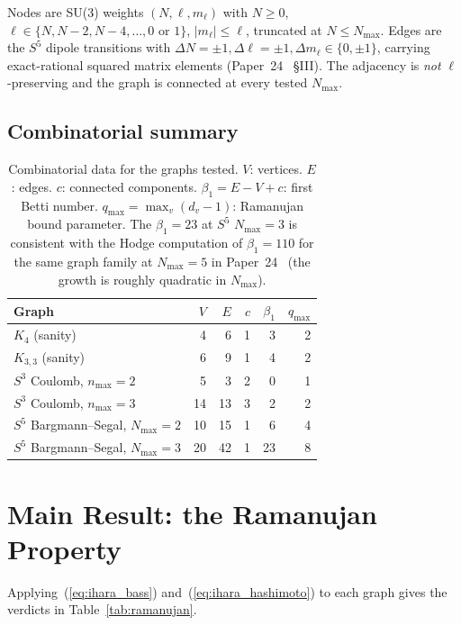 \documentclass[11pt]{article}
\begin{document}
Nodes are SU(3) weights $(N,\ell,m_\ell)$ with $N\ge 0$,
$\ell\in\{N, N{-}2, N{-}4, \ldots, 0\text{ or }1\}$,
$|m_\ell|\le\ell$, truncated at $N\le N_{\max}$.  Edges are the $S^5$
dipole transitions with $\Delta N=\pm 1, \Delta\ell=\pm 1,
\Delta m_\ell\in\{0,\pm 1\}$, carrying exact-rational squared
matrix elements (Paper~24~\cite{paper24} \S III).  The adjacency is
\emph{not} $\ell$-preserving and the graph is connected at every
tested $N_{\max}$.

\subsection{Combinatorial summary}

\begin{table}[h]
\centering
\begin{tabular}{lrrrrr}
\toprule
Graph & $V$ & $E$ & $c$ & $\beta_1$ & $q_{\max}$ \\
\midrule
$K_4$ (sanity) & 4 & 6 & 1 & 3 & 2 \\
$K_{3,3}$ (sanity) & 6 & 9 & 1 & 4 & 2 \\
$S^3$ Coulomb, $n_{\max}=2$ & 5 & 3 & 2 & 0 & 1 \\
$S^3$ Coulomb, $n_{\max}=3$ & 14 & 13 & 3 & 2 & 2 \\
$S^5$ Bargmann--Segal, $N_{\max}=2$ & 10 & 15 & 1 & 6 & 4 \\
$S^5$ Bargmann--Segal, $N_{\max}=3$ & 20 & 42 & 1 & 23 & 8 \\
\bottomrule
\end{tabular}
\caption{Combinatorial data for the graphs tested.  $V$: vertices.
$E$: edges.  $c$: connected components.  $\beta_1=E-V+c$: first Betti
number.  $q_{\max}=\max_v(d_v-1)$: Ramanujan bound parameter.  The
$\beta_1=23$ at $S^5$ $N_{\max}=3$ is consistent with the Hodge
computation of $\beta_1=110$ for the same graph family at $N_{\max}=5$
in Paper~24~\cite{paper24} (the growth is roughly quadratic in
$N_{\max}$).}
\label{tab:combinatorics}
\end{table}

\section{Main Result: the Ramanujan Property}
\label{sec:main_result}

Applying~(\ref{eq:ihara_bass}) and~(\ref{eq:ihara_hashimoto}) to each
graph gives the verdicts in Table~\ref{tab:ramanujan}.
\end{document}
